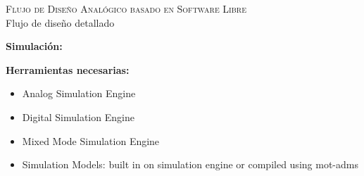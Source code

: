 \documentclass[ps,clariphy]{prosper}
\begin{document}
\begin{slide}{ \textsc{{\tiny Flujo de Dise\~no Anal\'ogico basado en Software Libre}}\\ Flujo de dise\~no detallado}
  \vspace{-0.5cm}
  \tiny{
\textbf{Simulaci\'on:} 
    \begin{figure}[ht] 
      \centering
    \end{figure}
    \textbf{Herramientas necesarias:} 
\begin{itemize}
	\item Analog Simulation Engine
	\item Digital Simulation Engine
	\item Mixed Mode Simulation Engine
	\item Simulation Models: built in on simulation engine or compiled using mot-adms
    \end{itemize}
  }
\end{slide}
\end{document}
